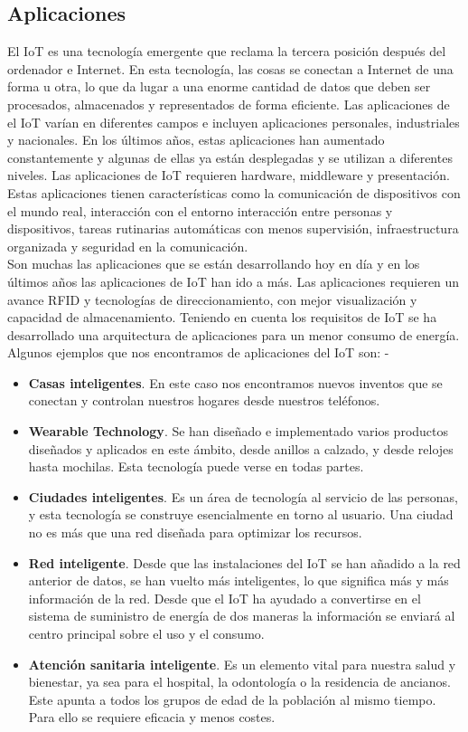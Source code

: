 {\subsection{Aplicaciones}

El IoT es una tecnología emergente que reclama la tercera posición después del ordenador e Internet. En esta tecnología, las cosas se conectan a Internet de una forma u otra, lo que da lugar a una enorme cantidad de datos que deben ser procesados, almacenados y representados de forma eficiente. Las aplicaciones de el IoT varían en diferentes campos e incluyen aplicaciones personales, industriales y nacionales. En los últimos años, estas aplicaciones han aumentado constantemente y algunas de ellas ya están desplegadas y se utilizan a diferentes niveles. Las aplicaciones de IoT requieren hardware, middleware y presentación. Estas aplicaciones tienen características como la comunicación de dispositivos con el mundo real, interacción con el entorno interacción entre personas y dispositivos, tareas rutinarias automáticas con menos supervisión, infraestructura organizada y seguridad en la comunicación.\\

Son muchas las aplicaciones que se están desarrollando hoy en día y en los últimos años las aplicaciones de IoT han ido a más. Las aplicaciones requieren un avance RFID y tecnologías de direccionamiento, con mejor visualización y capacidad de almacenamiento. Teniendo en cuenta los requisitos de IoT se ha desarrollado una arquitectura de aplicaciones para un menor consumo de energía. Algunos ejemplos que nos encontramos de aplicaciones del IoT son: \cite{8320780}-\cite{tripathy2017internet}

\begin{itemize}
    \item \textbf{Casas inteligentes}. En este caso nos encontramos nuevos inventos que se conectan y controlan nuestros hogares desde nuestros teléfonos.
    \item \textbf{Wearable Technology}. Se han diseñado e implementado varios productos diseñados y aplicados en este ámbito, desde anillos a calzado, y desde relojes hasta mochilas. Esta tecnología puede verse en todas partes.
    \item \textbf{Ciudades inteligentes}. Es un área de tecnología al servicio de las personas, y esta tecnología se construye esencialmente en torno al usuario. Una ciudad no es más que una red diseñada para optimizar los recursos.
    \item \textbf{Red inteligente}. Desde que las instalaciones del IoT se han añadido a la red anterior de datos, se han vuelto más inteligentes, lo que significa más y más información de la red. Desde que el IoT ha ayudado a convertirse en el sistema de suministro de energía de dos maneras la información se enviará al centro principal sobre el uso y el consumo.
    \item \textbf{Atención sanitaria inteligente}. Es un elemento vital para nuestra salud y bienestar, ya sea para el hospital, la odontología o la residencia de ancianos. Este apunta a todos los grupos de edad de la población al mismo tiempo. Para ello se requiere eficacia y menos costes.
\end{itemize}

}

